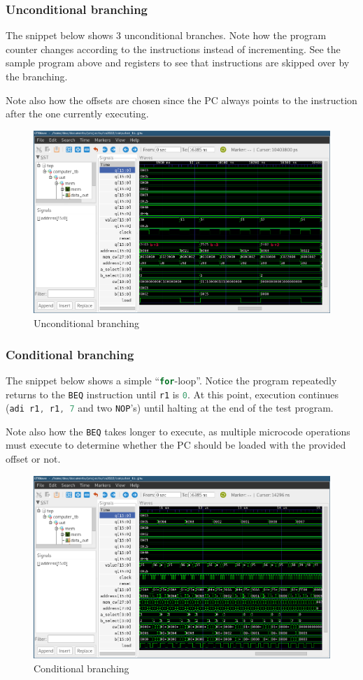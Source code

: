 \documentclass[a4paper]{article}
\numberwithin{figure}{section}
\numberwithin{table}{section}
\newcommand{\mi}{\mintinline}
\begin{document}
\newpage
\subsubsection{Unconditional branching}
The snippet below shows 3 unconditional branches. Note how the program counter changes according to the 
instructions instead of incrementing. See the sample program above and registers to see that instructions are 
skipped over by the branching.

Note also how the offsets are chosen since the PC always points to the instruction after the one currently 
executing.
\begin{figure}[h!]
	\centering
	\includegraphics[width=\textwidth]{unc_branch}
	\caption{Unconditional branching}
\end{figure}

\newpage
\subsubsection{Conditional branching}
The snippet below shows a simple ``\mi{c}{for}-loop''. Notice the program repeatedly returns to the \mi{c}{BEQ} 
instruction until \mi{c}{r1} is \mi{c}{0}. At this point, execution continues (\mi{c}{adi r1, r1, 7} and two 
\mi{c}{NOP}'s) until halting at the end of the test program.

Note also how the \mi{c}{BEQ} takes longer to execute, as multiple microcode operations must execute to determine
whether the PC should be loaded with the provided offset or not.
\begin{figure}[h!]
	\centering
	\includegraphics[width=\textwidth]{cond_branch}
	\caption{Conditional branching}
\end{figure}
\end{document}

